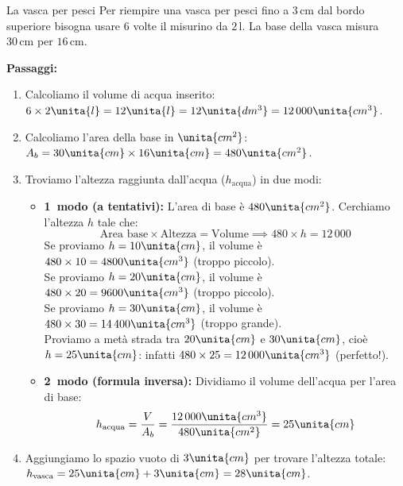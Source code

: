 \begin{esercizio}{La vasca per pesci}
Per riempire una vasca per pesci fino a $3\,\mathrm{cm}$ dal bordo superiore bisogna usare $6$ volte il misurino da $2\,\mathrm{l}$. La base della vasca misura $30\,\mathrm{cm}$ per $16\,\mathrm{cm}$.




\responsespace{6.2cm}
\condnewpage

\begin{soluzione}
  \textbf{Passaggi:}
  \begin{enumerate}
    \item Calcoliamo il volume di acqua inserito: $6 \times 2\unita{l} = 12\unita{l} = 12\unita{dm^3} = 12\,000\unita{cm^3}$.
    \item Calcoliamo l'area della base in $\unita{cm^2}$: $A_b = 30\unita{cm} \times 16\unita{cm} = 480\unita{cm^2}$.
    \item Troviamo l'altezza raggiunta dall'acqua ($h_{\text{acqua}}$) in due modi:
    \begin{itemize}
      \item \textbf{1\textdegree\ modo (a tentativi):} L'area di base è $480\unita{cm^2}$. Cerchiamo l'altezza $h$ tale che:
      \[
      \text{Area base} \times \text{Altezza} = \text{Volume} \implies 480 \times h = 12\,000
      \]
      Se proviamo $h = 10\unita{cm}$, il volume è $480 \times 10 = 4800\unita{cm^3}$ (troppo piccolo).\\
      Se proviamo $h = 20\unita{cm}$, il volume è $480 \times 20 = 9600\unita{cm^3}$ (troppo piccolo).\\
      Se proviamo $h = 30\unita{cm}$, il volume è $480 \times 30 = 14\,400\unita{cm^3}$ (troppo grande).\\
      Proviamo a metà strada tra $20\unita{cm}$ e $30\unita{cm}$, cioè $h = 25\unita{cm}$: infatti $480 \times 25 = 12\,000\unita{cm^3}$ (perfetto!).
      \item \textbf{2\textdegree\ modo (formula inversa):} Dividiamo il volume dell'acqua per l'area di base:
      \[
      h_{\text{acqua}} = \frac{V}{A_b} = \frac{12\,000\unita{cm^3}}{480\unita{cm^2}} = 25\unita{cm}
      \]
    \end{itemize}
    \item Aggiungiamo lo spazio vuoto di $3\unita{cm}$ per trovare l'altezza totale: $h_{\text{vasca}} = 25\unita{cm} + 3\unita{cm} = 28\unita{cm}$.
  \end{enumerate}
\end{soluzione}
\end{esercizio}

